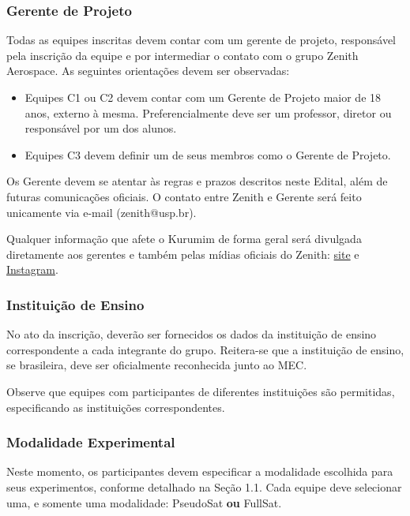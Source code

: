         \subsubsection{Gerente de Projeto}
            Todas as equipes inscritas devem contar com um gerente de projeto, 
            responsável pela inscrição da equipe e por intermediar o contato 
            com o grupo Zenith Aerospace. As seguintes orientações devem ser observadas:
            
            \begin{itemize}
                \item Equipes C1 ou C2 devem contar com um Gerente de Projeto maior de 18 anos, externo à mesma. Preferencialmente deve ser um professor, diretor ou responsável por um dos alunos.
                \item  Equipes C3 devem definir um de seus membros como o Gerente de Projeto.
            \end{itemize}
    
            Os Gerente devem se atentar às regras e prazos descritos neste Edital, 
            além de futuras comunicações oficiais. O contato entre Zenith e Gerente
            será feito unicamente via e-mail (zenith@usp.br).
            
            Qualquer informação que afete o Kurumim de forma geral será 
            divulgada diretamente aos gerentes e também pelas mídias 
            oficiais do Zenith: \href{https://zenith.eesc.usp.br/kurumim}{site} e \href{https://www.instagram.com/zenith\_eesc/}{Instagram}.
    
        \subsubsection{Instituição de Ensino}
            No ato da inscrição, deverão ser fornecidos os dados da instituição de ensino correspondente a cada integrante do grupo. Reitera-se que a instituição de ensino, se brasileira, deve ser oficialmente reconhecida junto ao MEC.
    
            Observe que equipes com participantes de diferentes instituições são permitidas, especificando as instituições correspondentes.

        \subsubsection{Modalidade Experimental}
            Neste momento, os participantes devem especificar a modalidade escolhida para seus experimentos, conforme detalhado na Seção 1.1. Cada equipe deve selecionar uma, e somente uma modalidade: PseudoSat \textbf{ou} FullSat.

